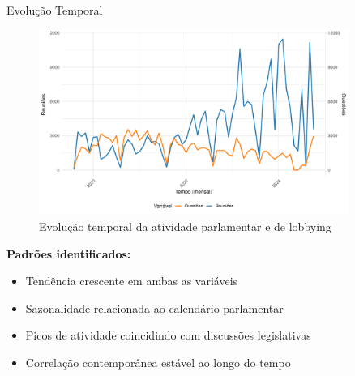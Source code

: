 \documentclass[aspectratio=169]{beamer}
\begin{document}
\begin{frame}{Evolução Temporal}
\begin{figure}
\centering
\includegraphics[width=0.9\textwidth]{figures/fig1_time_series_meetings_questions.pdf}
\caption{Evolução temporal da atividade parlamentar e de lobbying}
\end{figure}

\textbf{Padrões identificados:}
\begin{itemize}
\item Tendência crescente em ambas as variáveis
\item Sazonalidade relacionada ao calendário parlamentar
\item Picos de atividade coincidindo com discussões legislativas
\item Correlação contemporânea estável ao longo do tempo
\end{itemize}
\end{frame}
\end{document}
